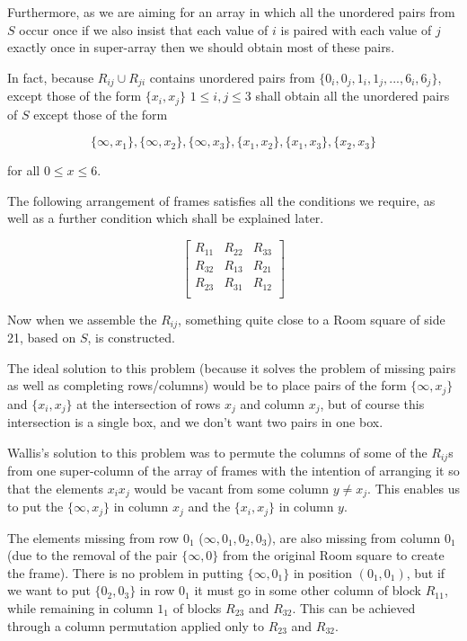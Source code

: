 \begin{example}
Furthermore, as we are aiming for an array in which all the unordered pairs from $S$ occur once if we also insist that each value of $i$ is paired with each value of $j$ exactly once in super-array then we should obtain most of these pairs.

In fact, because $R_{ij} \cup R_{ji}$ contains unordered pairs from $\{0_i,0_j,1_i,1_j,...,6_i,6_j\}$, except those of the form $\{x_i,x_j\}$ $1 \leq i,j \leq 3$ shall obtain all the unordered pairs of $S$ except those of the form

\begin{equation}
\{\infty, x_1\}, \{\infty, x_2\}, \{\infty, x_3\}, \{x_1, x_2\}, \{x_1, x_3\}, \{x_2, x_3\}
\end{equation}

for all $0 \leq x \leq 6$.

The following arrangement of frames satisfies all the conditions we require, as well as a further condition which shall be explained later.

\begin{equation}
  \begin{bmatrix}
    R_{11} & R_{22} & R_{33} \\
    R_{32} & R_{13} & R_{21} \\
    R_{23} & R_{31} & R_{12} \\
  \end{bmatrix}
\end{equation}

Now when we assemble the $R_{ij}$, something quite close to a Room square of side 21, based on $S$, is constructed.

\end{example}

The ideal solution to this problem (because it solves the problem of missing pairs as well as completing rows/columns) would be to place pairs of the form $\{\infty, x_j\}$ and $\{x_i, x_j\}$ at the intersection of rows $x_j$ and column $x_j$, but of course this intersection is a single box, and we don’t want two pairs in one box.

Wallis’s solution to this problem was to permute the columns of some of the $R_{ij}$s from one super-column of the array of frames with the intention of arranging it so that the elements $x_i x_j$ would be vacant from some column $y \neq x_j$.
This enables us to put the $\{\infty, x_j\}$ in column $x_j$ and the $\{x_i,x_j\}$ in column $y$.

The elements missing from row $0_1$ ($\infty, 0_1, 0_2, 0_3$), are also missing from column $0_1$ (due to the removal of the pair $\{\infty,0\}$ from the original Room square to create the frame).
There is no problem in putting $\{\infty,0_1\}$ in position $(0_1,0_1)$, but if we want to put $\{0_2,0_3\}$ in row $0_1$ it must go in some other column of block $R_{11}$, while remaining in column $1_1$ of blocks $R_{23}$ and $R_{32}$. This can be achieved through a column permutation applied only to $R_{23}$ and $R_{32}$.

